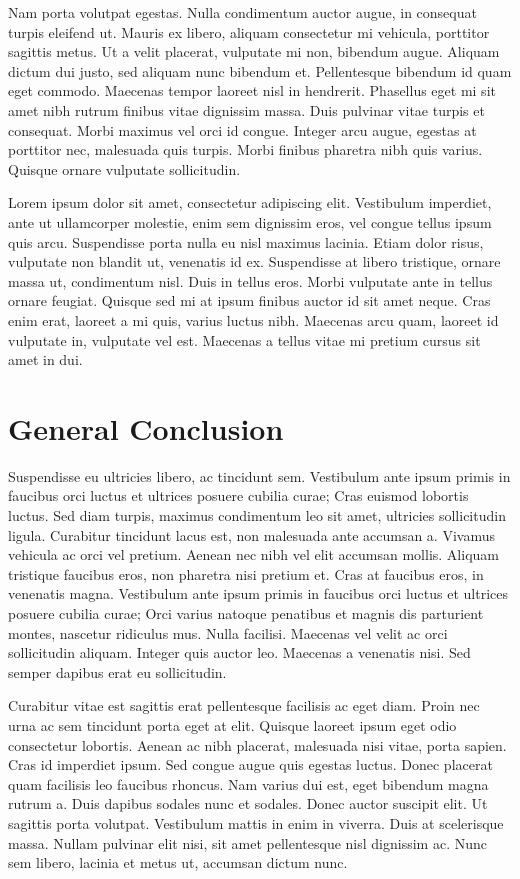 \begin{refsection}
Nam porta volutpat egestas. Nulla condimentum auctor augue, in consequat turpis eleifend ut. Mauris ex libero, aliquam consectetur mi vehicula, porttitor sagittis metus. Ut a velit placerat, vulputate mi non, bibendum augue. Aliquam dictum dui justo, sed aliquam nunc bibendum et. Pellentesque bibendum id quam eget commodo. Maecenas tempor laoreet nisl in hendrerit. Phasellus eget mi sit amet nibh rutrum finibus vitae dignissim massa. Duis pulvinar vitae turpis et consequat. Morbi maximus vel orci id congue. Integer arcu augue, egestas at porttitor nec, malesuada quis turpis. Morbi finibus pharetra nibh quis varius. Quisque ornare vulputate sollicitudin.

Lorem ipsum dolor sit amet, consectetur adipiscing elit. Vestibulum imperdiet, ante ut ullamcorper molestie, enim sem dignissim eros, vel congue tellus ipsum quis arcu. Suspendisse porta nulla eu nisl maximus lacinia. Etiam dolor risus, vulputate non blandit ut, venenatis id ex. Suspendisse at libero tristique, ornare massa ut, condimentum nisl. Duis in tellus eros. Morbi vulputate ante in tellus ornare feugiat. Quisque sed mi at ipsum finibus auctor id sit amet neque. Cras enim erat, laoreet a mi quis, varius luctus nibh. Maecenas arcu quam, laoreet id vulputate in, vulputate vel est. Maecenas a tellus vitae mi pretium cursus sit amet in dui. 
\newpage
\section{General Conclusion}
\vspace{-5pt}

Suspendisse eu ultricies libero, ac tincidunt sem. Vestibulum ante ipsum primis in faucibus orci luctus et ultrices posuere cubilia curae; Cras euismod lobortis luctus. Sed diam turpis, maximus condimentum leo sit amet, ultricies sollicitudin ligula. Curabitur tincidunt lacus est, non malesuada ante accumsan a. Vivamus vehicula ac orci vel pretium. Aenean nec nibh vel elit accumsan mollis. Aliquam tristique faucibus eros, non pharetra nisi pretium et. Cras at faucibus eros, in venenatis magna. Vestibulum ante ipsum primis in faucibus orci luctus et ultrices posuere cubilia curae; Orci varius natoque penatibus et magnis dis parturient montes, nascetur ridiculus mus. Nulla facilisi. Maecenas vel velit ac orci sollicitudin aliquam. Integer quis auctor leo. Maecenas a venenatis nisi. Sed semper dapibus erat eu sollicitudin.

Curabitur vitae est sagittis erat pellentesque facilisis ac eget diam. Proin nec urna ac sem tincidunt porta eget at elit. Quisque laoreet ipsum eget odio consectetur lobortis. Aenean ac nibh placerat, malesuada nisi vitae, porta sapien. Cras id imperdiet ipsum. Sed congue augue quis egestas luctus. Donec placerat quam facilisis leo faucibus rhoncus. Nam varius dui est, eget bibendum magna rutrum a. Duis dapibus sodales nunc et sodales. Donec auctor suscipit elit. Ut sagittis porta volutpat. Vestibulum mattis in enim in viverra. Duis at scelerisque massa. Nullam pulvinar elit nisi, sit amet pellentesque nisl dignissim ac. Nunc sem libero, lacinia et metus ut, accumsan dictum nunc.


\end{refsection}
